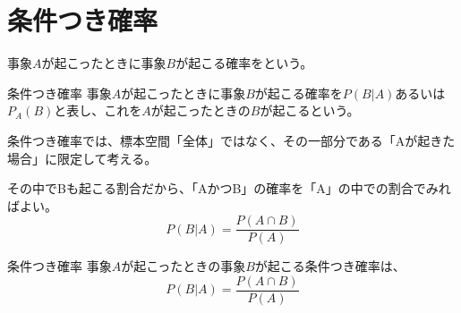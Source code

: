 \documentclass[../../../topic_statistics]{subfiles}
\begin{document}
\sectionline
\section{条件つき確率}

事象$A$が起こったときに事象$B$が起こる確率をという。

\begin{definition}{条件つき確率}
  事象$A$が起こったときに事象$B$が起こる確率を$P(B|A)$あるいは$P_A(B)$と表し、これを$A$が起こったときの$B$が起こるという。
\end{definition}

条件つき確率では、標本空間「全体」ではなく、その一部分である「Aが起きた場合」に限定して考える。

その中でBも起こる割合だから、「AかつB」の確率を「A」の中での割合でみればよい。
\begin{equation*}
  P(B|A) = \frac{P(A \cap B)}{P(A)}
\end{equation*}

\begin{theorem}{条件つき確率}
  事象$A$が起こったときの事象$B$が起こる条件つき確率は、
  \begin{equation*}
    P(B|A) = \frac{P(A \cap B)}{P(A)}
  \end{equation*}
\end{theorem}
\end{document}
